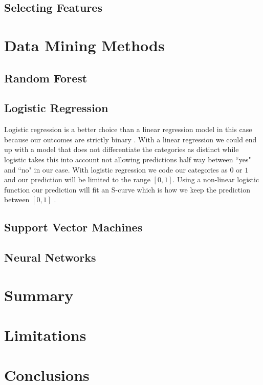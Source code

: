 \documentclass[a4paper, oneside, 11pt]{article}
\begin{document}
\subsection{Selecting Features}

\section{Data Mining Methods}
\subsection{Random Forest}
\subsection{Logistic Regression}
Logistic regression is a better choice than a linear regression model in this case because our outcomes are strictly binary \cite{james_introduction_2013}. With a linear regression we could end up with a model that does not differentiate the categories as distinct while logistic takes this into account not allowing predictions half way between ``yes" and ``no" in our case. With logistic regression we code our categories as $0$ or $1$ and our prediction will be limited to the range $[0,1]$. Using a non-linear logistic function our prediction will fit an S-curve which is how we keep the prediction between $[0,1]$ \cite{james_introduction_2013}.


\subsection{Support Vector Machines}
\subsection{Neural Networks}
\section{Summary}

\section{Limitations}

\section{Conclusions}

\newpage


\newpage
\appendix
\end{document}
